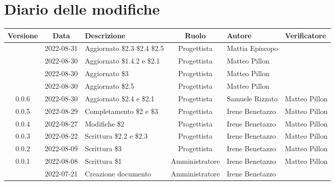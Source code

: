 \section*{Diario delle modifiche}
	\begin{center}
	\renewcommand{\arraystretch}{1.8} %
	\begin{longtable}{ |c|c|p{8em}|c|m{5em}|m{6em}| }
	\hline
	\textbf{Versione} & \textbf{Data} & \textbf{Descrizione} &  \textbf{Ruolo} &  \textbf{Autore} & \textbf{Verificatore}\\ %
	\hline %
	& 2022-08-31 & Aggiornato \$2.3 \$2.4 \$2.5 & Progettista & Mattia \newline Episcopo & \\ 
	\hline
	& 2022-08-30 & Aggiornato \$1.4.2 e \$2.1 & Progettista & Matteo \newline Pillon & \\ 
	\hline
	& 2022-08-30 & Aggiornato \$3 & Progettista & Matteo \newline Pillon & \\ 
	\hline
	& 2022-08-30 & Aggiornato \$2.5 & Progettista & Matteo \newline Pillon & \\ 
	\hline
	0.0.6& 2022-08-30 & Aggiornato \$2.4 e \$2.1 & Progettista & Samuele \newline Rizzato & Matteo Pillon \\ 
	\hline
	0.0.5& 2022-08-29 & Completamento \$2 e \$3 & Progettista & Irene \newline Benetazzo & Matteo \newline Pillon\\ 
	\hline
	0.0.4& 2022-08-27 & Modifiche \$2 & Progettista & Irene \newline Benetazzo & Matteo \newline Pillon \\ 
	\hline
	0.0.3& 2022-08-22 & Scrittura \$2.2 e \$2.3 & Progettista & Irene \newline Benetazzo & Matteo Pillon\\ 
	\hline
    0.0.2& 2022-08-09 & Scrittura \$3 & Progettista & Irene \newline Benetazzo & Matteo \newline Pillon \\ 
	\hline
	0.0.1& 2022-08-08 & Scrittura \$1 & Amministratore & Irene \newline Benetazzo & Matteo Pillon\\ 
	\hline
	& 2022-07-21 & Creazione documento & Amministratore & Irene \newline Benetazzo & \\ 
	\hline
	\end{longtable}
	\end{center}
	\newpage